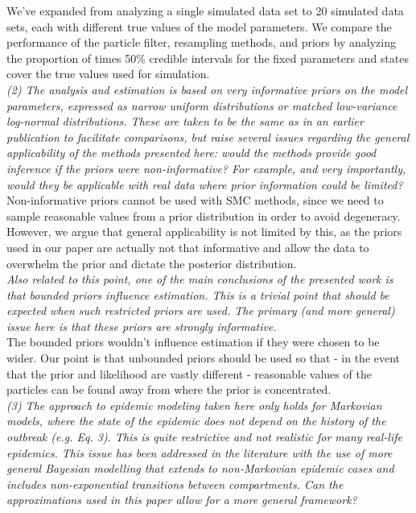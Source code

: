 \documentclass{article}
\begin{document}
We've expanded from analyzing a single simulated data set to 20 simulated data sets, each with different true values of the model parameters. We compare the performance of the particle filter, resampling methods, and priors by analyzing the proportion of times 50\% credible intervals for the fixed parameters and states cover the true values used for simulation. \\

\noindent \emph{(2) The analysis and estimation is based on very informative priors on the model parameters, expressed as narrow uniform distributions or matched low-variance log-normal distributions. These are taken to be the same as in an earlier publication to facilitate comparisons, but raise several issues regarding the general applicability of the methods presented here: would the methods provide good inference if the priors were non-informative? For example, and very importantly, would they be applicable with real data where prior information could be limited?} \\

Non-informative priors cannot be used with SMC methods, since we need to sample reasonable values from a prior distribution in order to avoid degeneracy. However, we argue that general applicability is not limited by this, as the priors used in our paper are actually not that informative and allow the data to overwhelm the prior and dictate the posterior distribution. \\

\noindent \emph{Also related to this point, one of the main conclusions of the presented work is that bounded priors influence estimation. This is a trivial point that should be expected when such restricted priors are used. The primary (and more general) issue here is that these priors are strongly informative.} \\

The bounded priors wouldn't influence estimation if they were chosen to be wider. Our point is that unbounded priors should be used so that - in the event that the prior and likelihood are vastly different - reasonable values of the particles can be found away from where the prior is concentrated. \\

\noindent \emph{(3) The approach to epidemic modeling taken here only holds for Markovian models, where the state of the epidemic does not depend on the history of the outbreak (e.g. Eq. 3). This is quite restrictive and not realistic for many real-life epidemics. This issue has been addressed in the literature with the use of more general Bayesian modelling that extends to non-Markovian epidemic cases and includes non-exponential transitions between compartments. Can the approximations used in this paper allow for a more general framework?} \\
\end{document}
